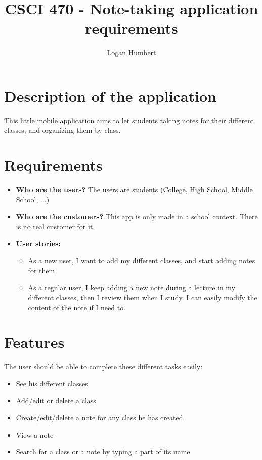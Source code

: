\documentclass[]{article}
\title{CSCI 470 - Note-taking application requirements}
\author{Logan Humbert}
\begin{document}
	
	\maketitle
	
	\pagebreak
	
	\tableofcontents
	
	\listoffigures
	
	\pagebreak
	
	\section{Description of the application}
	
	This little mobile application aims to let students taking notes for their different classes, and organizing them by class.
	
	\section{Requirements}
	
	\begin{itemize}
		\item \textbf{Who are the users? } The users are students (College, High School, Middle School, ...)
		
		\item \textbf{Who are the customers?} This app is only made in a school context. There is no real customer for it.
		
		\item  \textbf{User stories:}
			\begin{itemize}
				\item As a new user, I want to add my different classes, and start adding notes for them
				
				\item  As a regular user, I keep adding a new note during a lecture in my different classes, then I review them when I study.
				I can easily modify the content of the note if I need to.
			\end{itemize}
		
	\end{itemize}
	
	\section{Features}
	
	The user should be able to complete these different tasks easily:
	
	\begin{itemize}
		\item See his different classes
		\item Add/edit or delete a class
		\item Create/edit/delete a note for any class he has created
		\item View a note
		\item  Search for a class or a note by typing a part of its name
	\end{itemize}
	
\end{document}
